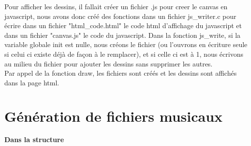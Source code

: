 \documentclass{report}
\begin{document}
Pour afficher les dessins, il fallait créer un fichier .js pour creer le canvas en javascript, nous avons donc créé des fonctions dans un fichier js\_writer.c pour écrire dans un fichier "html\_code.html" le code html d'affichage du javascript et dans un fichier "canvas.js" le code du javascript. Dans la fonction js\_write, si la variable globale init est nulle, nous créons le fichier (ou l'ouvrons en écriture seule si celui ci existe déjà de façon à le remplacer), et si celle ci est à 1, nous écrivons au milieu du fichier pour ajouter les dessins sans supprimer les autres.\\
Par appel de la fonction draw, les fichiers sont créés et les dessins sont affichés dans la page html.

\part{Génération de fichiers musicaux}
\subsection{Dans la structure}
\end{document}
